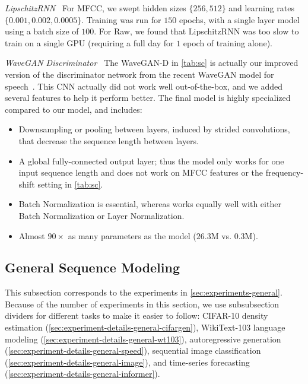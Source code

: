\textit{LipschitzRNN~\citep{erichson2021lipschitz}} For MFCC, we swept hidden sizes $\{256, 512\}$ and learning rates $\{0.001, 0.002, 0.0005\}$. Training was run for $150$ epochs, with a single layer model using a batch size of $100$. For Raw, we found that LipschitzRNN was too slow to train on a single GPU (requiring a full day for $1$ epoch of training alone).

\textit{WaveGAN Discriminator~\citep{Donahue2019AdversarialAS}}
The WaveGAN-D in \cref{tab:sc} is actually our improved version of the discriminator network from the recent WaveGAN model for speech~\citep{Donahue2019AdversarialAS}.
This CNN actually did not work well out-of-the-box, and we added several features to help it perform better.
The final model is highly specialized compared to our model, and includes:
\begin{itemize}%
  \item Downsampling or pooling between layers, induced by strided convolutions, that decrease the sequence length between layers.
  \item A global fully-connected output layer; thus the model only works for one input sequence length and does not work on MFCC features or the frequency-shift setting in \cref{tab:sc}.
  \item Batch Normalization is essential, whereas \methodabbrv{} works equally well with either Batch Normalization or Layer Normalization.
  \item Almost \( 90\times \) as many parameters as the \methodabbrv{} model ($26.3$M vs. $0.3$M).
\end{itemize}

\subsection{General Sequence Modeling}
\label{sec:experiment-details-general}

This subsection corresponds to the experiments in \cref{sec:experiments-general}.
Because of the number of experiments in this section,
we use subsubsection dividers for different tasks to make it easier to follow:
CIFAR-10 density estimation (\cref{sec:experiment-details-general-cifargen}),
WikiText-103 language modeling (\cref{sec:experiment-details-general-wt103}),
autoregressive generation (\cref{sec:experiment-details-general-speed}),
sequential image classification (\cref{sec:experiment-details-general-image}),
and time-series forecasting (\cref{sec:experiment-details-general-informer}).

